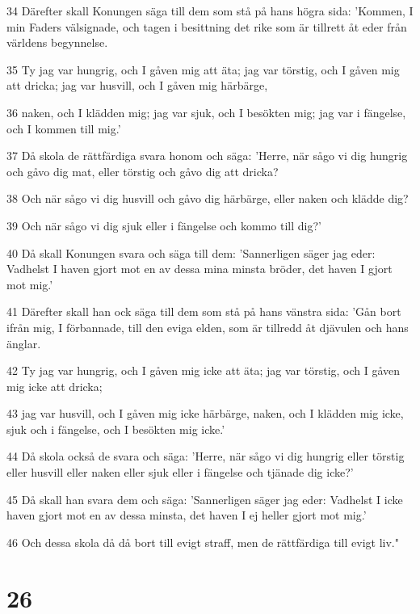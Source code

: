 \par 34 Därefter skall Konungen säga till dem som stå på hans högra sida: 'Kommen, I min Faders välsignade, och tagen i besittning det rike som är tillrett åt eder från världens begynnelse.
\par 35 Ty jag var hungrig, och I gåven mig att äta; jag var törstig, och I gåven mig att dricka; jag var husvill, och I gåven mig härbärge,
\par 36 naken, och I klädden mig; jag var sjuk, och I besökten mig; jag var i fängelse, och I kommen till mig.'
\par 37 Då skola de rättfärdiga svara honom och säga: 'Herre, när sågo vi dig hungrig och gåvo dig mat, eller törstig och gåvo dig att dricka?
\par 38 Och när sågo vi dig husvill och gåvo dig härbärge, eller naken och klädde dig?
\par 39 Och när sågo vi dig sjuk eller i fängelse och kommo till dig?'
\par 40 Då skall Konungen svara och säga till dem: 'Sannerligen säger jag eder: Vadhelst I haven gjort mot en av dessa mina minsta bröder, det haven I gjort mot mig.'
\par 41 Därefter skall han ock säga till dem som stå på hans vänstra sida: 'Gån bort ifrån mig, I förbannade, till den eviga elden, som är tillredd åt djävulen och hans änglar.
\par 42 Ty jag var hungrig, och I gåven mig icke att äta; jag var törstig, och I gåven mig icke att dricka;
\par 43 jag var husvill, och I gåven mig icke härbärge, naken, och I klädden mig icke, sjuk och i fängelse, och I besökten mig icke.'
\par 44 Då skola också de svara och säga: 'Herre, när sågo vi dig hungrig eller törstig eller husvill eller naken eller sjuk eller i fängelse och tjänade dig icke?'
\par 45 Då skall han svara dem och säga: 'Sannerligen säger jag eder: Vadhelst I icke haven gjort mot en av dessa minsta, det haven I ej heller gjort mot mig.'
\par 46 Och dessa skola då då bort till evigt straff, men de rättfärdiga till evigt liv."

\chapter{26}

